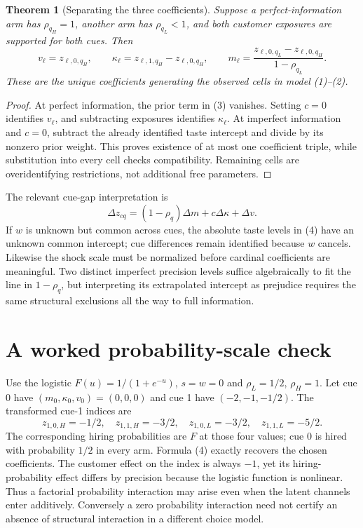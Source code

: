 \documentclass[11pt,a4paper]{article}
\newtheorem{theorem}{Theorem}[section]
\begin{document}
\begin{theorem}[Separating the three coefficients]
Suppose a perfect-information arm has $\rho_{q_H}=1$, another arm has $\rho_{q_L}<1$, and both customer exposures are supported for both cues. Then
\[
 v_\ell=z_{\ell,0,q_H},\qquad
 \kappa_\ell=z_{\ell,1,q_H}-z_{\ell,0,q_H},\qquad
 m_\ell=\frac{z_{\ell,0,q_L}-z_{\ell,0,q_H}}
                   {1-\rho_{q_L}}.                      \tag{4}
\]
These are the unique coefficients generating the observed cells in model (1)--(2).
\end{theorem}
\begin{proof}
At perfect information, the prior term in (3) vanishes. Setting $c=0$ identifies $v_\ell$, and subtracting exposures identifies $\kappa_\ell$. At imperfect information and $c=0$, subtract the already identified taste intercept and divide by its nonzero prior weight. This proves existence of at most one coefficient triple, while substitution into every cell checks compatibility. Remaining cells are overidentifying restrictions, not additional free parameters.
\end{proof}

The relevant cue-gap interpretation is
\[
 \Delta z_{cq}=(1-\rho_q)\Delta m+c\Delta\kappa+\Delta v.  \tag{5}
\]
If $w$ is unknown but common across cues, the absolute taste levels in (4) have an unknown common intercept; cue differences remain identified because $w$ cancels. Likewise the shock scale must be normalized before cardinal coefficients are meaningful. Two distinct imperfect precision levels suffice algebraically to fit the line in $1-\rho_q$, but interpreting its extrapolated intercept as prejudice requires the same structural exclusions all the way to full information.

\section{A worked probability-scale check}
Use the logistic $F(u)=1/(1+e^{-u})$, $s=w=0$ and $\rho_L=1/2$, $\rho_H=1$. Let cue 0 have $(m_0,\kappa_0,v_0)=(0,0,0)$ and cue 1 have $(-2,-1,-1/2)$. The transformed cue-1 indices are
\[
 z_{1,0,H}=-1/2,\quad z_{1,1,H}=-3/2,\quad
 z_{1,0,L}=-3/2,\quad z_{1,1,L}=-5/2.
\]
The corresponding hiring probabilities are $F$ at those four values; cue 0 is hired with probability $1/2$ in every arm. Formula (4) exactly recovers the chosen coefficients. The customer effect on the index is always $-1$, yet its hiring-probability effect differs by precision because the logistic function is nonlinear. Thus a factorial probability interaction may arise even when the latent channels enter additively. Conversely a zero probability interaction need not certify an absence of structural interaction in a different choice model.
\end{document}
